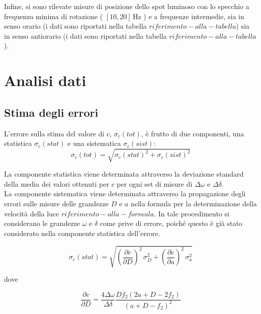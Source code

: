 \documentclass{article} %
\let\oldsection\section%
\renewcommand{\section}{%
	\renewcommand{\theequation}{\thesection.\arabic{equation}}%
	\oldsection}%
\let\oldsubsection\subsection%
\renewcommand{\subsection}{%
	\renewcommand{\theequation}{\thesubsection.\arabic{equation}}%
	\oldsubsection}%
\begin{document}
    Infine, si sono rilevate misure di posizione dello spot luminoso con lo specchio a frequenza minima di rotazione ( $[10,20] \, \text{Hz}$ )
    e a frequenze intermedie, sia in senso orario (i dati sono riportati nella tabella $ riferimento-alla-tabella $) sia 
    in senso antiorario (i dati sono riportati nella tabella $ riferimento-alla-tabella $). \\
    
    \section {Analisi dati}


    \subsection {Stima degli errori}

    L'errore sulla stima del valore di $ c $, $ \sigma_c(tot) $, è frutto di due componenti, una statistica $\sigma_c(stat)$ e una sistematica $\sigma_c(sist)$:
    \begin{equation}
        \label{sigma_tot}
        \sigma_c(tot) = \sqrt{ \sigma_c(stat) ^2 + \sigma_c(sist) ^2 } 
    \end{equation}
    
    La componente statistica viene determinata attraverso la deviazione standard della media dei valori ottenuti per $c$ per ogni set di misure di $ \Delta \omega $ e $ \Delta \delta $. \\
    La componente sistematica viene determinata attraverso la propagazione degli errori sulle misure delle grandezze $D$ e $a$ nella formula per la determinazione della velocità della luce $ riferimento-alla-formula $. In tale procedimento si considerano le grandezze  $\omega$ e $\delta$ come prive di errore, poiché questo è già stato considerato nella componente statistica dell'errore.

    \begin{equation}
        \label{sigma_stat}
        \sigma_c(stat) = \sqrt{ (\frac{\partial c}{\partial D})^2 \, \sigma_D ^2 + (\frac{\partial c}{\partial a})^2 \, \sigma_a ^2 } 
    \end{equation}

    dove

    \begin{equation}
        \label{eqn:propD}
        \frac{\partial c}{\partial D} = \frac{4\Delta \omega}{\Delta \delta} \frac{D f_2 (2a + D -2f_2)}{(a + D -f_2)^2}
        \end{equation}
\end{document}
